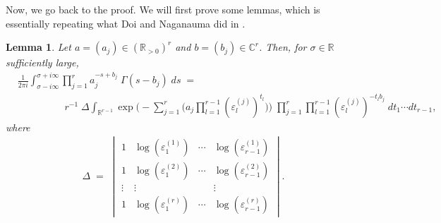 \documentclass[11pt]{amsart}
\newtheorem{lemma}[theorem]{Lemma}
\theoremstyle{remark}
\newcommand{\real}{\mathbb{R}}
\newcommand{\comp}{\mathbb{C}}
\newcommand{\eps}{\varepsilon}
\newcommand{\eq}{\;=\;}
\begin{document}
Now, we go back to the proof. We will first prove some lemmas, which is essentially repeating what Doi and Naganauma did in \cite[Section~3]{doinaganuma}.

\begin{lemma}
\label{gammafunction}
Let $a=(a_j)\in(\real_{>0})^r$ and $b=(b_j)\in\comp^r$. Then, for $\sigma\in\real$ sufficiently large, 
\begin{align*}
    &\frac{1}{2\pi i}\int_{\sigma-i\infty}^{\sigma+i\infty}\prod_{j=1}^r a_j^{-s+b_j}\;\Gamma(s-b_j)\; ds\eq\\
    &\hspace{2cm}r^{-1}\;\Delta\int_{\real^{r-1}}\exp\bigg(-\sum\limits_{j=1}^r \big(a_j\prod\limits_{l=1}^{r-1}(\eps_l^{(j)})^{t_l}\big)\bigg)\;\prod_{j=1}^r\prod_{l=1}^{r-1}(\eps_l^{(j)})^{-t_lb_j}\;dt_1\cdots dt_{r-1},
\end{align*}
where
\begin{align*}
    \Delta\eq\begin{vmatrix}1&\log(\eps_1^{(1)})&\cdots&\log(\eps_{r-1}^{(1)})\\ 1&\log(\eps_1^{(2)})&\cdots&\log(\eps_{r-1}^{(2)})\\
    \vdots&\vdots & &\vdots \\ 1&\log(\eps_1^{(r)})&\cdots&\log(\eps_{r-1}^{(r)}) \end{vmatrix}.
\end{align*}
\end{lemma}
\end{document}
